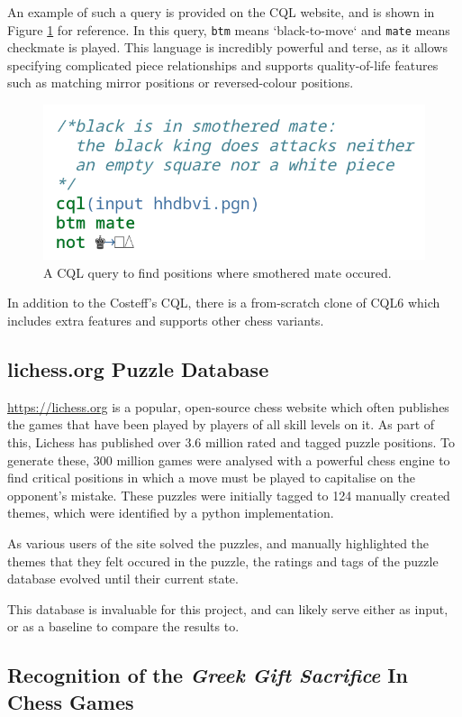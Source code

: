 An example of such a query is provided on the CQL website,\cite{cqlSmothered}
and is shown in Figure \ref{cql} for reference. In this query, \texttt{btm}
means `black-to-move` and \texttt{mate} means checkmate is played. This
language is incredibly powerful and terse, as it allows specifying complicated
piece relationships and supports quality-of-life features such as matching
mirror positions or reversed-colour positions.

\begin{figure}[H]
    \centering
    \includegraphics[width=0.45\linewidth]{background/img/cql.png}
    \caption{A CQL query to find positions where smothered mate occured.}
    \label{cql}
\end{figure}

In addition to the Costeff's CQL, there is a from-scratch clone of CQL6
which includes extra features and supports other chess
variants.\cite{cqli}

\subsection{lichess.org Puzzle Database}

\url{https://lichess.org} is a popular, open-source chess website which often
publishes the games that have been played by players of all skill levels on it.
As part of this, Lichess has published over 3.6 million rated and tagged puzzle
positions.\cite{lichessPuzzles} To generate these, 300 million games were
analysed with a powerful chess engine to find critical positions in which a
move must be played to capitalise on the opponent's mistake. These puzzles were
initially tagged to 124 manually created themes,\cite{lichessXML} which were
identified by a python implementation.\cite{lichessTagger} 

As various users of the site solved the puzzles, and manually highlighted the
themes that they felt occured in the puzzle, the ratings and tags of the puzzle
database evolved until their current state.

This database is invaluable for this project, and can likely serve either as
input, or as a baseline to compare the results to.

\subsection{Recognition of the \emph{Greek Gift Sacrifice} In Chess Games}

